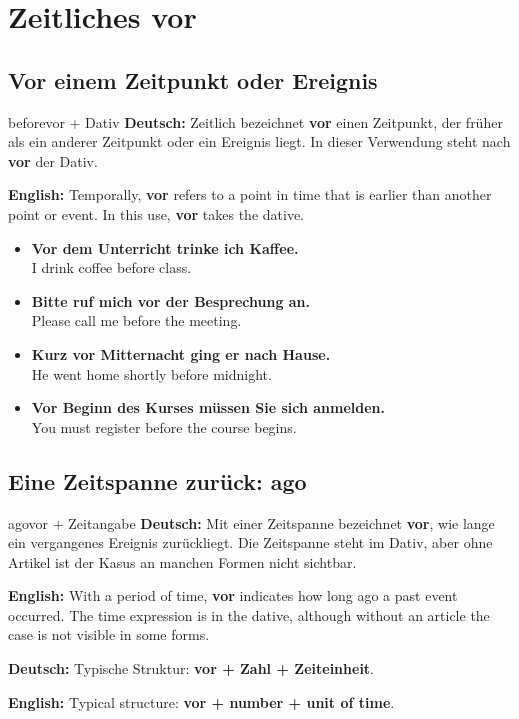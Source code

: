 \documentclass[a4paper,11pt]{article}
\newcommand{\GermanText}[1]{\textbf{Deutsch: }#1\par}
\newcommand{\EnglishText}[1]{{\small\color{SoftGray}\textbf{English: }#1\par}}
\newcommand{\ExampleItem}[2]{\item \textbf{#1}\\{\small\color{SoftGray}#2}}
\begin{document}
    \section{Zeitliches \glqq vor\grqq}

        \subsection{Vor einem Zeitpunkt oder Ereignis}

            \begin{grammarentry}{before}{vor + Dativ}
                \GermanText{Zeitlich bezeichnet \textbf{vor} einen Zeitpunkt, der früher als ein anderer Zeitpunkt oder ein Ereignis liegt. In dieser Verwendung steht nach \textbf{vor} der Dativ.}
                \EnglishText{Temporally, \textbf{vor} refers to a point in time that is earlier than another point or event. In this use, \textbf{vor} takes the dative.}
            \end{grammarentry}

            \begin{exbox}
                \begin{itemize}
                    \ExampleItem{Vor dem Unterricht trinke ich Kaffee.}{I drink coffee before class.}
                    \ExampleItem{Bitte ruf mich vor der Besprechung an.}{Please call me before the meeting.}
                    \ExampleItem{Kurz vor Mitternacht ging er nach Hause.}{He went home shortly before midnight.}
                    \ExampleItem{Vor Beginn des Kurses müssen Sie sich anmelden.}{You must register before the course begins.}
                \end{itemize}
            \end{exbox}

        \subsection{Eine Zeitspanne zurück: \glqq ago\grqq}

            \begin{grammarentry}{ago}{vor + Zeitangabe}
                \GermanText{Mit einer Zeitspanne bezeichnet \textbf{vor}, wie lange ein vergangenes Ereignis zurückliegt. Die Zeitspanne steht im Dativ, aber ohne Artikel ist der Kasus an manchen Formen nicht sichtbar.}
                \EnglishText{With a period of time, \textbf{vor} indicates how long ago a past event occurred. The time expression is in the dative, although without an article the case is not visible in some forms.}

                \GermanText{Typische Struktur: \textbf{vor + Zahl + Zeiteinheit}.}
                \EnglishText{Typical structure: \textbf{vor + number + unit of time}.}
            \end{grammarentry}
\end{document}
